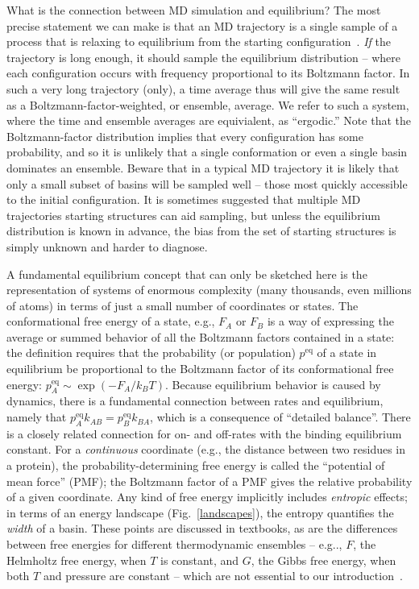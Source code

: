 \documentclass[9pt,bestpractices]{livecoms}
\newcommand{\peq}{p^{\mathrm{eq}}}
\begin{document}
What is the connection between MD simulation and equilibrium?  The most precise statement we can make is that an MD trajectory is a single sample of a process that is relaxing to equilibrium from the starting configuration~\cite{Zuckerman:2015:StatisticalBiophysicsBlog, Zuckerman:2010:}.  
\emph{If} the trajectory is long enough, it should sample the equilibrium distribution -- where each configuration occurs with frequency proportional to its Boltzmann factor.  
In such a very long trajectory (only), a time average thus will give the same result as a Boltzmann-factor-weighted, or ensemble, average.  
We refer to such a system, where the time and ensemble averages are equivialent, as ``ergodic.''
Note that the Boltzmann-factor distribution implies that every configuration has some probability, and so it is unlikely that a single conformation or even a single basin dominates an ensemble. 
Beware that in a typical MD trajectory it is likely that only a small subset of basins will be sampled well -- those most quickly accessible to the initial configuration.  
It is sometimes suggested that multiple MD trajectories starting structures can aid sampling, but unless the equilibrium distribution is known in advance, the bias from the set of starting structures is simply unknown and harder to diagnose.

A fundamental equilibrium concept that can only be sketched here is the representation of systems of enormous complexity (many thousands, even millions of atoms) in terms of just a small number of coordinates or states.  
The conformational free energy of a state, e.g., $F_A$ or $F_B$ is a way of expressing the average or summed behavior of all the Boltzmann factors contained in a state: the definition requires that the probability (or population) $\peq$ of a state in equilibrium be proportional to the Boltzmann factor of its conformational free energy: $\peq_A \sim \exp(-F_A/k_BT)$.  
Because equilibrium behavior is caused by dynamics, there is a fundamental connection between rates and equilibrium, namely that $\peq_A k_{AB} = \peq_B k_{BA}$, which is a consequence of ``detailed balance''.
There is a closely related connection for on- and off-rates with the binding equilibrium constant.   
For a \emph{continuous} coordinate (e.g., the distance between two residues in a protein), the probability-determining free energy is called the ``potential of mean force'' (PMF); the Boltzmann factor of a PMF gives the relative probability of a given coordinate.  
Any kind of free energy implicitly includes \emph{entropic} effects; in terms of an energy landscape (Fig.\ \ref{landscapes}), the entropy quantifies the \emph{width} of a basin.  
These points are discussed in textbooks, as are the differences between free energies for different thermodynamic ensembles -- e.g.., $F$, the Helmholtz free energy, when $T$ is constant, and $G$, the Gibbs free energy, when both $T$ and pressure are constant -- which are not essential to our introduction~\cite{DillBook, Zuckerman:2010:}.
\end{document}
